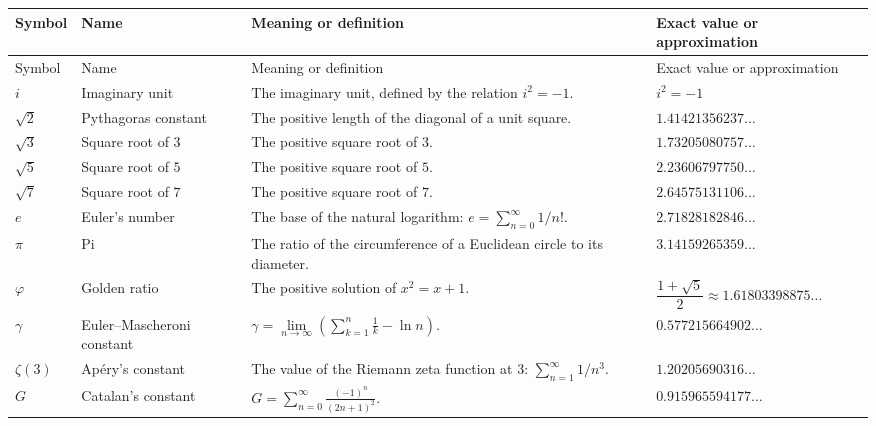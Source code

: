     {\small
    \renewcommand{\arraystretch}{1.18}
    \begin{longtable}{@{}L{0.12\textwidth}L{0.22\textwidth}L{0.38\textwidth}L{0.20\textwidth}@{}}
        \toprule
        Symbol & Name & Meaning or definition & Exact value or approximation \\
        \midrule
        \endfirsthead

        \toprule
        Symbol & Name & Meaning or definition & Exact value or approximation \\
        \midrule
        \endhead

        \bottomrule
        \endlastfoot

        $i$
        & Imaginary unit
        & The imaginary unit, defined by the relation $i^2=-1$.
        & $i^2=-1$ \\

        $\sqrt{2}$
        & Pythagoras constant
        & The positive length of the diagonal of a unit square.
        & $1.41421356237\ldots$ \\

        $\sqrt{3}$
        & Square root of $3$
        & The positive square root of $3$.
        & $1.73205080757\ldots$ \\

        $\sqrt{5}$
        & Square root of $5$
        & The positive square root of $5$.
        & $2.23606797750\ldots$ \\

        $\sqrt{7}$
        & Square root of $7$
        & The positive square root of $7$.
        & $2.64575131106\ldots$ \\

        $e$
        & Euler's number
        & The base of the natural logarithm:
          $e=\sum_{n=0}^{\infty}1/n!$.
        & $2.71828182846\ldots$ \\

        $\pi$
        & Pi
        & The ratio of the circumference of a Euclidean circle to its diameter.
        & $3.14159265359\ldots$ \\

        $\varphi$
        & Golden ratio
        & The positive solution of $x^2=x+1$.
        & $\dfrac{1+\sqrt{5}}{2}\approx1.61803398875\ldots$ \\

        $\gamma$
        & Euler--Mascheroni constant
        & $\displaystyle
          \gamma=\lim\limits_{n\to\infty}
          \left(\sum_{k=1}^{n}\frac{1}{k}-\ln n\right)$.
        & $0.577215664902\ldots$ \\

        $\zeta(3)$
        & Apéry's constant
        & The value of the Riemann zeta function at $3$:
          $\displaystyle \sum_{n=1}^{\infty}1/n^3$.
        & $1.20205690316\ldots$ \\

        $G$
        & Catalan's constant
        & $\displaystyle
          G=\sum_{n=0}^{\infty}\frac{(-1)^n}{(2n+1)^2}$.
        & $0.915965594177\ldots$ \\
    \end{longtable}
    }

